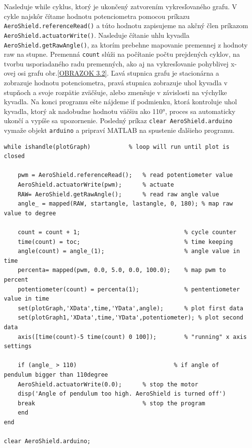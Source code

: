 Nasleduje while cyklus, ktorý je ukončený zatvorením vykresľovaného grafu. V cykle najskôr čítame hodnotu potenciometra pomocou príkazu \verb|AeroShield.referenceRead()| a túto hodnotu zapisujeme na akčný člen príkazom \verb| AeroShield.actuatorWrite()|. Nasleduje čítanie uhlu kyvadla \verb|AeroShield.getRawAngle()|, za ktorím prebehne mapovanie premennej z hodnoty raw na stupne. Premenná \verb|count| slúži na počítanie počtu prejdených cyklov, na tvorbu usporiadaného radu premenných, ako aj na vykresľovanie pohyblivej x-ovej osi grafu obr.\ref{OBRAZOK 3.2}. Ľavá stupnica grafu je stacionárna a zobrazuje hodnotu potenciometra, pravá stupnica zobrazuje uhol kyvadla v stupňoch a svoje rozpätie zväčšuje, alebo zmenšuje v závislosti na výchylke kyvadla. Na konci programu ešte nájdeme if podmienku, ktorá kontroluje uhol kyvadla, ktorý ak nadobudne hodnotu väčšiu ako 110°, proces sa automaticky ukončí a vypíše sa upozornenie. Posledný príkaz \verb|clear AeroShield.arduino| vymaže objekt \verb|arduino| a pripraví MATLAB na spustenie ďalšieho programu. 

\begin{lstlisting}[caption={AeroShield open loop, while cyklus.},captionpos=b]
while ishandle(plotGraph)           % loop will run until plot is closed
	
	pwm = AeroShield.referenceRead();   % read potentiometer value
	AeroShield.actuatorWrite(pwm);      % actuate 
	RAW= AeroShield.getRawAngle();      % read raw angle value
	angle_ = mapped(RAW, startangle, lastangle, 0, 180); % map raw value to degree 
	
	count = count + 1;                              % cycle counter
	time(count) = toc;                              % time keeping
	angle(count) = angle_(1);                       % angle value in time
	percenta= mapped(pwm, 0.0, 5.0, 0.0, 100.0);    % map pwm to percent 
	potentiometer(count) = percenta(1);             % pententiometer value in time
	set(plotGraph,'XData',time,'YData',angle);      % plot first data 
	set(plotGraph1,'XData',time,'YData',potentiometer); % plot second data 
	axis([time(count)-5 time(count) 0 100]);        % "running" x axis settings
	
	if (angle_ > 110)                            % if angle of pendulum bigger than 110degree
	AeroShield.actuatorWrite(0.0);      % stop the motor 
	disp('Angle of pendulum too high. AeroShield is turned off')
	break                               % stop the program
	end
end  

clear AeroShield.arduino;           
\end{lstlisting}

